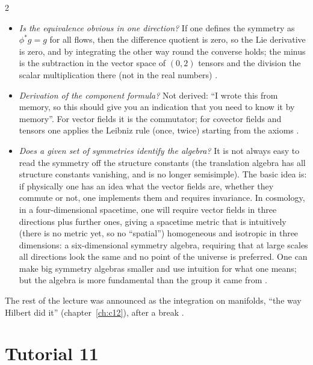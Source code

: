 \begin{paracol}{2}
\begin{coursenote}
\begin{itemize}
  \item \emph{Is the equivalence obvious in one direction?} If one defines the symmetry as $\phi^*g=g$ for all flows, then the difference quotient is zero, so the Lie derivative is zero, and by integrating the other way round the converse holds; the minus is the subtraction in the vector space of $(0,2)$ tensors and the division the scalar multiplication there (not in the real numbers) .
  \item \emph{Derivation of the component formula?} Not derived: ``I wrote this from memory, so this should give you an indication that you need to know it by memory''. For vector fields it is the commutator; for covector fields and tensors one applies the Leibniz rule (once, twice) starting from the axioms .
  \item \emph{Does a given set of symmetries identify the algebra?} It is not always easy to read the symmetry off the structure constants (the translation algebra has all structure constants vanishing, and is no longer semisimple). The basic idea is: if physically one has an idea what the vector fields are, whether they commute or not, one implements them and requires invariance. In cosmology, in a four-dimensional spacetime, one will require vector fields in three directions plus further ones, giving a spacetime metric that is intuitively (there is no metric yet, so no ``spatial'') homogeneous and isotropic in three dimensions: a six-dimensional symmetry algebra, requiring that at large scales all directions look the same and no point of the universe is preferred. One can make big symmetry algebras smaller and use intuition for what one means; but the algebra is more fundamental than the group it came from .
\end{itemize}
\end{coursenote}
The rest of the lecture was announced as the integration on manifolds, ``the way Hilbert did it'' (chapter~\ref{ch:c12}), after a break .

\section{Tutorial 11}\label{sec:t11-1}


\end{paracol}
